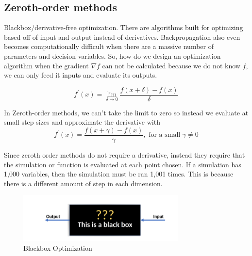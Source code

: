 \subsection{Zeroth-order methods}
Blackbox/derivative-free optimization. There are algorithms built for optimizing based off of input and output instead of derivatives. Backpropagation also even becomes computationally difficult when there are a massive number of parameters and decision variables. So, how do we design an optimization algorithm when the gradient $\nabla f $ can not be calculated because we do not know $f$, we can only feed it inputs and evaluate its outputs.

\begin{equation}
  f^\prime(x) = \lim_{\delta \to 0 } \frac{f(x + \delta) - f(x)}{\delta}
\end{equation}

In Zeroth-order methods, we can't take the limit to zero so instead we evaluate at small step sizes and approximate the derivative with 
\begin{equation}
  f^\prime(x) = \frac{f(x + \gamma) - f(x)}{\gamma}, \text{ for a small } \gamma \neq 0
\end{equation}

Since zeroth order methods do not require a derivative, instead they require that the simulation or function is evaluated at each point chosen. If a simulation has 1,000 variables, then the simulation must be ran 1,001 times. This is because there is a different amount of step in each dimension.

\begin{figure}[htbp]
  \centerline{\includegraphics[width=0.75\textwidth]{images/black_box.png}}
  \caption{Blackbox Optimization}
  \label{fig:black_box}
\end{figure}
